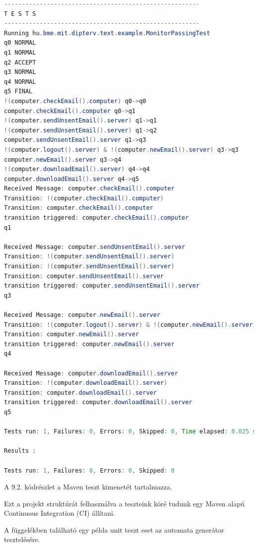 \begin{lstlisting}[language=java, frame=single, float=ht!, caption={Integrációs teszteset eredménye.},captionpos=b]
-------------------------------------------------------
T E S T S
-------------------------------------------------------
Running hu.bme.mit.dipterv.text.example.MonitorPassingTest
q0 NORMAL
q1 NORMAL
q2 ACCEPT
q3 NORMAL
q4 NORMAL
q5 FINAL
!(computer.checkEmail().computer) q0->q0
computer.checkEmail().computer q0->q1
!(computer.sendUnsentEmail().server) q1->q1
!(computer.sendUnsentEmail().server) q1->q2
computer.sendUnsentEmail().server q1->q3
!(computer.logout().server) & !(computer.newEmail().server) q3->q3
computer.newEmail().server q3->q4
!(computer.downloadEmail().server) q4->q4
computer.downloadEmail().server q4->q5
Received Message: computer.checkEmail().computer
Transition: !(computer.checkEmail().computer)
Transition: computer.checkEmail().computer
transition triggered: computer.checkEmail().computer
q1

Received Message: computer.sendUnsentEmail().server
Transition: !(computer.sendUnsentEmail().server)
Transition: !(computer.sendUnsentEmail().server)
Transition: computer.sendUnsentEmail().server
transition triggered: computer.sendUnsentEmail().server
q3

Received Message: computer.newEmail().server
Transition: !(computer.logout().server) & !(computer.newEmail().server)
Transition: computer.newEmail().server
transition triggered: computer.newEmail().server
q4

Received Message: computer.downloadEmail().server
Transition: !(computer.downloadEmail().server)
Transition: computer.downloadEmail().server
transition triggered: computer.downloadEmail().server
q5

Tests run: 1, Failures: 0, Errors: 0, Skipped: 0, Time elapsed: 0.025 sec

Results :

Tests run: 1, Failures: 0, Errors: 0, Skipped: 0
\end{lstlisting}

A 9.2. kódrészlet a Maven teszt kimenetét tartalmazza.

Ezt a projekt struktúrát felhasználva a teszteink köré tudunk egy Maven alapú Continuous Integration (CI) állítani.

A függelékben található egy példa unit teszt eset az automata generátor tesztelésére.